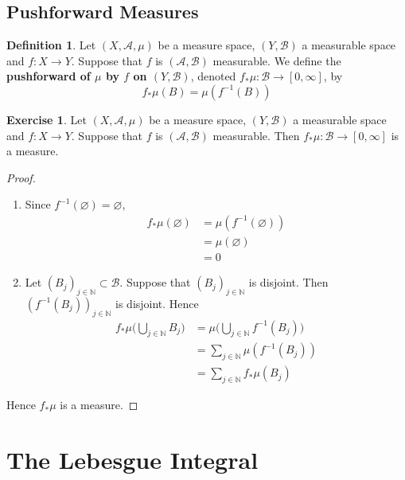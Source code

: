 \documentclass[12pt]{amsart}
\theoremstyle{definition}
\newtheorem{defn}[definition]{Definition}
\newtheorem{ex}[definition]{Exercise}
\newcommand{\N}{\mathbb{N}}
\newcommand{\MA}{\mathcal{A}}
\newcommand{\MB}{\mathcal{B}}
\newcommand{\RG}{[0,\infty]}
\begin{document}
	\newpage
	\subsection{Pushforward Measures}
	
	\begin{defn}
		Let $(X, \MA, \mu)$ be a measure space, $(Y, \MB)$ a measurable space and $f: X \rightarrow Y$. Suppose that $f$ is $(\MA, \MB)$ measurable. We define the \textbf{pushforward of $\mu$ by $f$ on $(Y, \MB)$}, denoted $f_*\mu: \MB \rightarrow [0, \infty]$, by $$f_*\mu(B) = \mu(f^{-1}(B))$$
	\end{defn}

	\begin{ex}
		Let $(X, \MA, \mu)$ be a measure space, $(Y, \MB)$ a measurable space and $f: X \rightarrow Y$. Suppose that $f$ is $(\MA, \MB)$ measurable. Then $f_*\mu: \MB \rightarrow \RG$ is a measure.
	\end{ex}

	\begin{proof}\
		\begin{enumerate}
			\item Since $f^{-1}(\varnothing) = \varnothing$, 
			\begin{align*}
				f_*\mu(\varnothing) 
				& = \mu(f^{-1}(\varnothing)) \\
				& = \mu(\varnothing) \\
				& = 0
			\end{align*}
			\item Let $(B_j)_{j \in \N} \subset \MB$. Suppose that $(B_j)_{j \in \N}$ is disjoint. Then $(f^{-1}(B_j))_{j \in \N}$ is disjoint. Hence 
			\begin{align*}
				f_*\mu \bigg( \bigcup_{j \in \N} B_j \bigg)
				& = \mu \bigg( \bigcup_{j \in \N} f^{-1}(B_j) \bigg) \\
				& = \sum_{j \in \N} \mu(f^{-1}(B_j)) \\
				& = \sum_{j \in \N} f_*\mu(B_j)
			\end{align*}
		\end{enumerate}
		Hence $f_* \mu$ is a measure.
	\end{proof}
	
	
	
	
	
	
	
	
	
	
	
	
	
	
	
	\newpage
	\section{The Lebesgue Integral}
	
\end{document}
